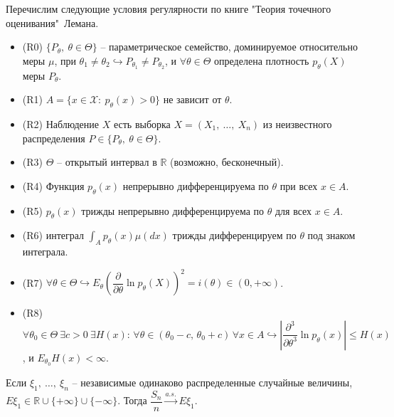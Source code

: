 Перечислим следующие условия регулярности по книге "Теория точечного оценивания"\, Лемана.
\begin{itemize}
    \item (R0) $\displaystyle \{P_{\theta } ,\ \theta \in \Theta \}$ -- параметрическое семейство, доминируемое относительно меры $\displaystyle \mu $, при $\displaystyle \theta _{1} \neq \theta _{2} \hookrightarrow P_{\theta _{1}} \neq P_{\theta _{2}}$, и $\displaystyle \forall \theta \in \Theta $ определена плотность $\displaystyle p_{\theta }( X)$ меры $\displaystyle P_{\theta }$.
    \item (R1) $\displaystyle A=\{x\in \mathcal{X} :\ p_{\theta }( x)  >0\}$ не зависит от $\displaystyle \theta $.
    \item (R2) Наблюдение $\displaystyle X$ есть выборка $\displaystyle X=( X_{1} ,\ \dotsc ,\ X_{n})$ из неизвестного распределения $\displaystyle P\in \{P_{\theta } ,\ \theta \in \Theta \}$.
    \item (R3) $\displaystyle \Theta $ -- открытый интервал в $\displaystyle \mathbb{R}$ (возможно, бесконечный).
    \item (R4) Функция $\displaystyle p_{\theta }(x)$ непрерывно дифференцируема по $\displaystyle \theta $ при всех $\displaystyle x\in A$.
    \item (R5) $\displaystyle p_{\theta }( x)$ трижды непрерывно дифференцируема по $\theta$ для всех $x \in A$.
    \item (R6) интеграл $\displaystyle \int _{A} p_{\theta }( x) \mu ( dx)$ трижды дифференцируем по $\displaystyle \theta $ под знаком интеграла.
    \item (R7) $\forall \theta\in\Theta \hookrightarrow \displaystyle E_{\theta }\left(\dfrac{\partial }{\partial \theta }\ln p_{\theta }( X)\right)^{2} = i(\theta) \in (0, +\infty)$.
    \item (R8) $\displaystyle \forall \theta _{0} \in \Theta \ \exists c >0\ \exists H(x):\, \forall \theta \in (\theta_0 - c,\, \theta_0 + c)\, \forall x \in A \hookrightarrow \left| \dfrac{\partial ^{3}}{\partial \theta ^{3}}\ln p_{\theta }(x)\right| \leqslant H(x)$, и $\displaystyle E_{\theta _{0}} H(x) < \infty $.
\end{itemize}
\begin{lemma}
    Если $\displaystyle \xi _{1} ,\ \dotsc ,\ \xi _{n}$ -- независимые одинаково распределенные случайные величины, $\displaystyle E\xi _{1} \in \mathbb{R} \cup \{+\infty \} \cup \{-\infty \}$. Тогда $\displaystyle \dfrac{S_{n}}{n}\xrightarrow{a.s.} E\xi _{1}$.
\end{lemma}
